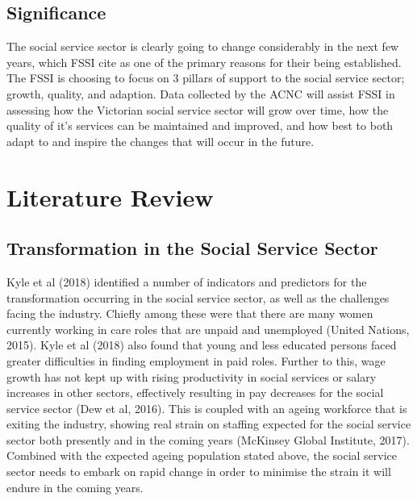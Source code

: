 \documentclass[
  11pt,
]{article}
\begin{document}
\hypertarget{significance}{%
\subsection{Significance}\label{significance}}

The social service sector is clearly going to change considerably in the next few years, which FSSI cite as one of the primary reasons for their being established. The FSSI is choosing to focus on 3 pillars of support to the social service sector; growth, quality, and adaption. Data collected by the ACNC will assist FSSI in assessing how the Victorian social service sector will grow over time, how the quality of it's services can be maintained and improved, and how best to both adapt to and inspire the changes that will occur in the future.

\newpage

\hypertarget{literature-review}{%
\section{Literature Review}\label{literature-review}}

\hypertarget{transformation-in-the-social-service-sector}{%
\subsection{Transformation in the Social Service Sector}\label{transformation-in-the-social-service-sector}}

Kyle et al (2018) identified a number of indicators and predictors for the transformation occurring in the social service sector, as well as the challenges facing the industry. Chiefly among these were that there are many women currently working in care roles that are unpaid and unemployed (United Nations, 2015). Kyle et al (2018) also found that young and less educated persons faced greater difficulties in finding employment in paid roles. Further to this, wage growth has not kept up with rising productivity in social services or salary increases in other sectors, effectively resulting in pay decreases for the social service sector (Dew et al, 2016). This is coupled with an ageing workforce that is exiting the industry, showing real strain on staffing expected for the social service sector both presently and in the coming years (McKinsey Global Institute, 2017).\\
Combined with the expected ageing population stated above, the social service sector needs to embark on rapid change in order to minimise the strain it will endure in the coming years.
\end{document}
